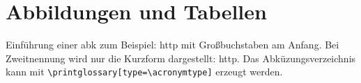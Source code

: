 \section{Abbildungen und Tabellen}
Einführung einer \gls{abk} zum Beispiel: \Gls{http} mit Großbuchstaben am Anfang. Bei Zweitnennung wird nur die Kurzform dargestellt: \gls{http}. Das Abküzungsverzeichnis kann mit \texttt{\textbackslash printglossary[type=\textbackslash acronymtype]}  erzeugt werden.

